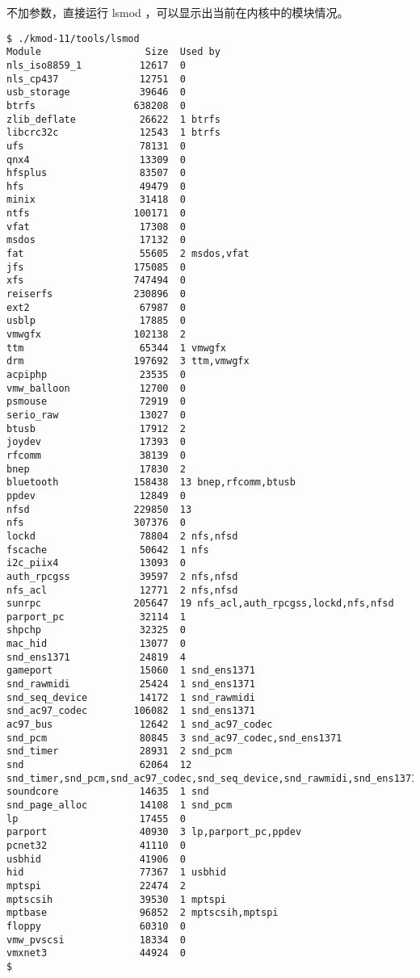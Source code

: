 \documentclass[11pt,a4paper]{article}
\begin{document}
不加参数，直接运行 lsmod ，可以显示出当前在内核中的模块情况。

{\begin{shaded}\begin{verbatim}
$ ./kmod-11/tools/lsmod 
Module                  Size  Used by
nls_iso8859_1          12617  0 
nls_cp437              12751  0 
usb_storage            39646  0 
btrfs                 638208  0 
zlib_deflate           26622  1 btrfs
libcrc32c              12543  1 btrfs
ufs                    78131  0 
qnx4                   13309  0 
hfsplus                83507  0 
hfs                    49479  0 
minix                  31418  0 
ntfs                  100171  0 
vfat                   17308  0 
msdos                  17132  0 
fat                    55605  2 msdos,vfat
jfs                   175085  0 
xfs                   747494  0 
reiserfs              230896  0 
ext2                   67987  0 
usblp                  17885  0 
vmwgfx                102138  2 
ttm                    65344  1 vmwgfx
drm                   197692  3 ttm,vmwgfx
acpiphp                23535  0 
vmw_balloon            12700  0 
psmouse                72919  0 
serio_raw              13027  0 
btusb                  17912  2 
joydev                 17393  0 
rfcomm                 38139  0 
bnep                   17830  2 
bluetooth             158438  13 bnep,rfcomm,btusb
ppdev                  12849  0 
nfsd                  229850  13 
nfs                   307376  0 
lockd                  78804  2 nfs,nfsd
fscache                50642  1 nfs
i2c_piix4              13093  0 
auth_rpcgss            39597  2 nfs,nfsd
nfs_acl                12771  2 nfs,nfsd
sunrpc                205647  19 nfs_acl,auth_rpcgss,lockd,nfs,nfsd
parport_pc             32114  1 
shpchp                 32325  0 
mac_hid                13077  0 
snd_ens1371            24819  4 
gameport               15060  1 snd_ens1371
snd_rawmidi            25424  1 snd_ens1371
snd_seq_device         14172  1 snd_rawmidi
snd_ac97_codec        106082  1 snd_ens1371
ac97_bus               12642  1 snd_ac97_codec
snd_pcm                80845  3 snd_ac97_codec,snd_ens1371
snd_timer              28931  2 snd_pcm
snd                    62064  12 snd_timer,snd_pcm,snd_ac97_codec,snd_seq_device,snd_rawmidi,snd_ens1371
soundcore              14635  1 snd
snd_page_alloc         14108  1 snd_pcm
lp                     17455  0 
parport                40930  3 lp,parport_pc,ppdev
pcnet32                41110  0 
usbhid                 41906  0 
hid                    77367  1 usbhid
mptspi                 22474  2 
mptscsih               39530  1 mptspi
mptbase                96852  2 mptscsih,mptspi
floppy                 60310  0 
vmw_pvscsi             18334  0 
vmxnet3                44924  0 
$ 
\end{verbatim}\end{shaded}}
\end{document}
